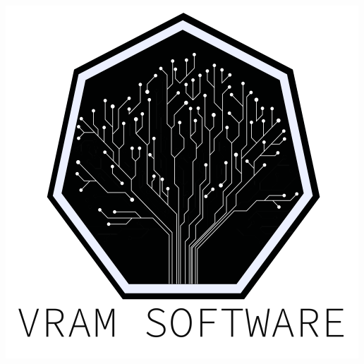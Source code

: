 
\setlength{\headheight}{39pt} %
\begin{titlepage}
	\begin{center}
		\includegraphics[scale=0.6]{img/logo} \\ %
		\vspace{1cm} %
		
		{\LARGE \DocAuthor} \\ %
		\vspace{0.5cm} %
		
		{\Huge \textbf{\DocTitle}} \\ %
		\vspace{0.5cm}
		
		\DocDate \\ %
		\vspace{1cm}
		
		

\end{center}
\end{titlepage}
